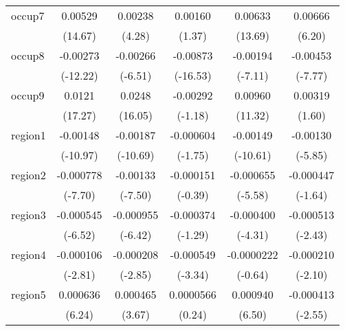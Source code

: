 \begin{table}[htbp]
\begin{tabular}{l*{5}{c}}
occup7      &     0.00529\sym{***}&     0.00238\sym{***}&     0.00160         &     0.00633\sym{***}&     0.00666\sym{***}\\
            &     (14.67)         &      (4.28)         &      (1.37)         &     (13.69)         &      (6.20)         \\
occup8      &    -0.00273\sym{***}&    -0.00266\sym{***}&    -0.00873\sym{***}&    -0.00194\sym{***}&    -0.00453\sym{***}\\
            &    (-12.22)         &     (-6.51)         &    (-16.53)         &     (-7.11)         &     (-7.77)         \\
occup9      &      0.0121\sym{***}&      0.0248\sym{***}&    -0.00292         &     0.00960\sym{***}&     0.00319         \\
            &     (17.27)         &     (16.05)         &     (-1.18)         &     (11.32)         &      (1.60)         \\
region1     &    -0.00148\sym{***}&    -0.00187\sym{***}&   -0.000604         &    -0.00149\sym{***}&    -0.00130\sym{***}\\
            &    (-10.97)         &    (-10.69)         &     (-1.75)         &    (-10.61)         &     (-5.85)         \\
region2     &   -0.000778\sym{***}&    -0.00133\sym{***}&   -0.000151         &   -0.000655\sym{***}&   -0.000447         \\
            &     (-7.70)         &     (-7.50)         &     (-0.39)         &     (-5.58)         &     (-1.64)         \\
region3     &   -0.000545\sym{***}&   -0.000955\sym{***}&   -0.000374         &   -0.000400\sym{***}&   -0.000513\sym{*}  \\
            &     (-6.52)         &     (-6.42)         &     (-1.29)         &     (-4.31)         &     (-2.43)         \\
region4     &   -0.000106\sym{**} &   -0.000208\sym{**} &   -0.000549\sym{***}&  -0.0000222         &   -0.000210\sym{*}  \\
            &     (-2.81)         &     (-2.85)         &     (-3.34)         &     (-0.64)         &     (-2.10)         \\
region5     &    0.000636\sym{***}&    0.000465\sym{***}&   0.0000566         &    0.000940\sym{***}&   -0.000413\sym{*}  \\
            &      (6.24)         &      (3.67)         &      (0.24)         &      (6.50)         &     (-2.55)         \\

\end{tabular}
\end{table}
